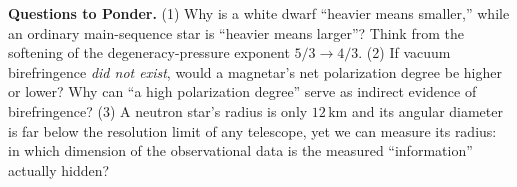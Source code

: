 \noindent\textbf{Questions to Ponder.}
(1) Why is a white dwarf ``heavier means smaller,'' while an ordinary main-sequence star is ``heavier means larger''? Think from the softening of the degeneracy-pressure exponent \(5/3\to4/3\).
(2) If vacuum birefringence \emph{did not exist}, would a magnetar's net polarization degree be higher or lower? Why can ``a high polarization degree'' serve as indirect evidence of birefringence?
(3) A neutron star's radius is only \(12\,\mathrm{km}\) and its angular diameter is far below the resolution limit of any telescope, yet we can measure its radius: in which dimension of the observational data is the measured ``information'' actually hidden?
